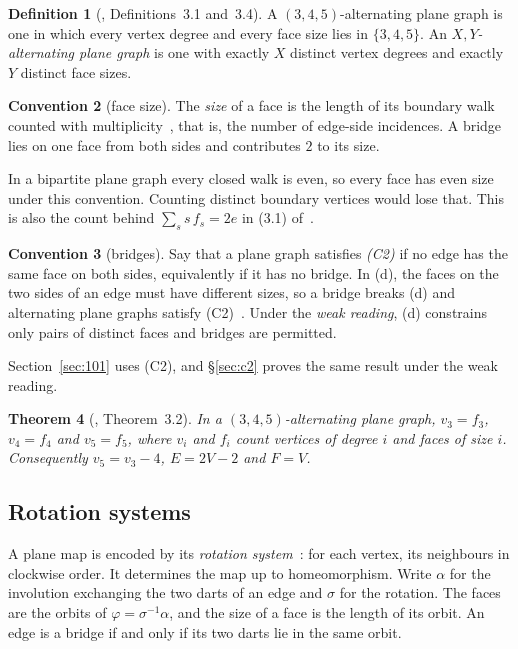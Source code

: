 \documentclass[11pt,a4paper]{amsart}
\theoremstyle{plain}
\newtheorem{theorem}{Theorem}[section]
\theoremstyle{definition}
\newtheorem{definition}[theorem]{Definition}
\newtheorem{convention}[theorem]{Convention}
\begin{document}
\begin{definition}[\cite{AHSSV2015}, Definitions~3.1 and~3.4]
A $(3,4,5)$-alternating plane graph is one in which every vertex degree and
every face size lies in $\{3,4,5\}$. An \emph{$X,Y$-alternating plane graph} is
one with exactly $X$ distinct vertex degrees and exactly $Y$ distinct face
sizes.
\end{definition}

\begin{convention}[face size]\label{conv:c1}
The \emph{size} of a face is the length of its boundary walk counted with
multiplicity~\cite[\S3.3]{MoharThomassen}, that is, the number of edge-side
incidences. A bridge lies on one face from both sides and contributes $2$ to its
size.
\end{convention}

In a bipartite plane graph every closed walk is even, so every face has even
size under this convention. Counting distinct boundary vertices would lose that.
This is also the count behind $\sum_s s\,f_s = 2e$ in (3.1)
of~\cite{AHSSV2015}.

\begin{convention}[bridges]\label{conv:c2}
Say that a plane graph satisfies \emph{(C2)} if no edge has the same face on
both sides, equivalently if it has no bridge. In (d), the faces on the two sides
of an edge must have different sizes, so a bridge breaks (d) and alternating
plane graphs satisfy (C2)~\cite{AHSSV2015}. Under the \emph{weak reading}, (d)
constrains only pairs of distinct faces and bridges are permitted.
\end{convention}

Section~\ref{sec:101} uses (C2), and \S\ref{sec:c2} proves the same result under
the weak reading.

\begin{theorem}[\cite{AHSSV2015}, Theorem~3.2]\label{thm:32}
In a $(3,4,5)$-alternating plane graph, $v_3 = f_3$, $v_4 = f_4$ and
$v_5 = f_5$, where $v_i$ and $f_i$ count vertices of degree $i$ and faces of
size $i$. Consequently $v_5 = v_3 - 4$, $E = 2V - 2$ and $F = V$.
\end{theorem}

\subsection{Rotation systems}

A plane map is encoded by its \emph{rotation system}~\cite{MoharThomassen}: for
each vertex, its neighbours in clockwise order. It determines the map up to
homeomorphism. Write $\alpha$ for the involution exchanging the two darts of an
edge and $\sigma$ for the rotation. The faces are the orbits of
$\varphi = \sigma^{-1}\alpha$, and the size of a face is the length of its
orbit. An edge is a bridge if and only if its two darts lie in the same orbit.
\end{document}
